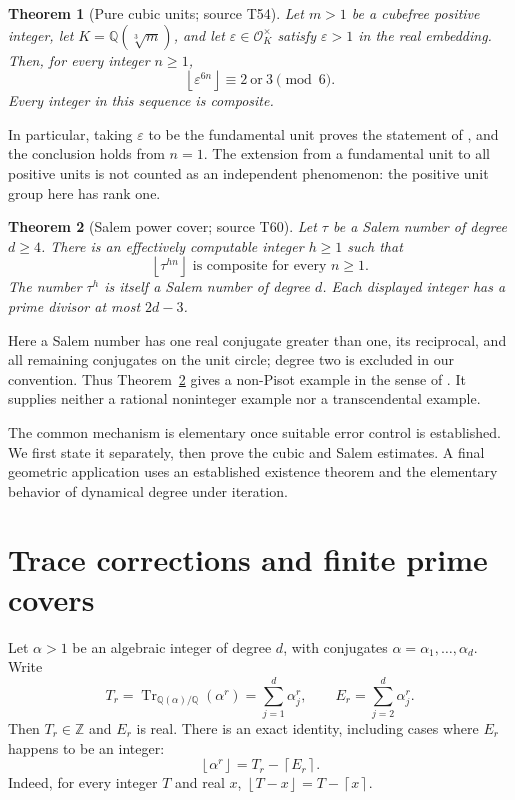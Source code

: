 \documentclass[11pt,a4paper]{article}
\newtheorem{theorem}{Theorem}[section]
\theoremstyle{definition}\newtheorem{definition}[theorem]{Definition}
\theoremstyle{remark}\newtheorem{remark}[theorem]{Remark}
\newcommand{\Q}{\mathbb Q}\newcommand{\Z}{\mathbb Z}\newcommand{\N}{\mathbb N}\newcommand{\R}{\mathbb R}\newcommand{\C}{\mathbb C}
\DeclareMathOperator{\Tr}{Tr}\DeclareMathOperator{\Norm}{N}\DeclareMathOperator{\trdeg}{trdeg}\DeclareMathOperator{\ord}{ord}\DeclareMathOperator{\lcm}{lcm}
\newcommand{\floor}[1]{\left\lfloor #1\right\rfloor}\newcommand{\ceil}[1]{\left\lceil #1\right\rceil}
\begin{document}
\begin{theorem}[Pure cubic units; source T54]\label{thm:cubic}
Let $m>1$ be a cubefree positive integer, let $K=\Q(\sqrt[3]{m})$, and let $\varepsilon\in\mathcal O_K^\times$ satisfy $\varepsilon>1$ in the real embedding. Then, for every integer $n\ge1$,
\[
 \floor{\varepsilon^{6n}}\equiv2\ \text{or}\ 3\pmod6.
\]
Every integer in this sequence is composite.
\end{theorem}

In particular, taking $\varepsilon$ to be the fundamental unit proves the statement of \cite[Conjecture~1]{HIKK}, and the conclusion holds from $n=1$. The extension from a fundamental unit to all positive units is not counted as an independent phenomenon: the positive unit group here has rank one.

\begin{theorem}[Salem power cover; source T60]\label{thm:salem}
Let $\tau$ be a Salem number of degree $d\ge4$. There is an effectively computable integer $h\ge1$ such that
\[
 \floor{\tau^{hn}}\text{ is composite for every }n\ge1.
\]
The number $\tau^h$ is itself a Salem number of degree $d$. Each displayed integer has a prime divisor at most $2d-3$.
\end{theorem}

Here a Salem number has one real conjugate greater than one, its reciprocal, and all remaining conjugates on the unit circle; degree two is excluded in our convention. Thus Theorem~\ref{thm:salem} gives a non-Pisot example in the sense of \cite[Section~7]{HIKK}. It supplies neither a rational noninteger example nor a transcendental example.

The common mechanism is elementary once suitable error control is established. We first state it separately, then prove the cubic and Salem estimates. A final geometric application uses an established existence theorem and the elementary behavior of dynamical degree under iteration.

\section{Trace corrections and finite prime covers}
Let $\alpha>1$ be an algebraic integer of degree $d$, with conjugates $\alpha=\alpha_1,\ldots,\alpha_d$. Write
\[
 T_r=\Tr_{\Q(\alpha)/\Q}(\alpha^r)=\sum_{j=1}^d\alpha_j^r,
 \qquad E_r=\sum_{j=2}^d\alpha_j^r.
\]
Then $T_r\in\Z$ and $E_r$ is real. There is an exact identity, including cases where $E_r$ happens to be an integer:
\begin{equation}\label{eq:floor}
 \floor{\alpha^r}=T_r-\ceil{E_r}.
\end{equation}
Indeed, for every integer $T$ and real $x$, $\floor{T-x}=T-\ceil{x}$.
\end{document}
